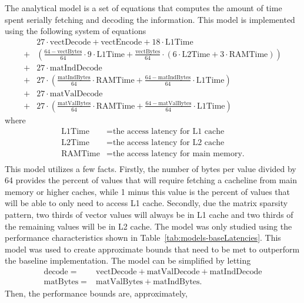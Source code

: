 The analytical model is a set of equations that computes the amount of time spent serially fetching and decoding the information.
This model is implemented using the following system of equations
\begin{align*}
	& 27\cdot \mathrm{vectDecode}+\mathrm{vectEncode} + 18\cdot \mathrm{L1Time} \\
	+ & \left(\frac{64-\mathrm{vectBytes}}{64}\cdot 9\cdot \mathrm{L1Time}+\frac{\mathrm{vectBytes}}{64}\cdot \left(6\cdot \mathrm{L2Time}+3\cdot \mathrm{RAMTime}\right)\right) \\
	+ & 27\cdot\mathrm{matIndDecode} \\
	+ & 27\cdot\left(\frac{\mathrm{matIndBytes}}{64}\cdot\mathrm{RAMTime} + \frac{64-\mathrm{matIndBytes}}{64}\cdot\mathrm{L1Time}\right) \\
	+ & 27\cdot\mathrm{matValDecode} \\
	+ & 27\cdot\left(\frac{\mathrm{matValBytes}}{64}\cdot\mathrm{RAMTime}+\frac{64-\mathrm{matValBytes}}{64}\cdot\mathrm{L1Time}\right)
\end{align*}
where
\begin{align*}
	\mathrm{L1Time} &= \text{the access latency for L1 cache} \\
	\mathrm{L2Time} &= \text{the access latency for L2 cache} \\
	\mathrm{RAMTime} &= \text{the access latency for main memory.} \\
\end{align*}
This model utilizes a few facts.
Firstly, the number of bytes per value divided by 64 provides the percent of values that will require fetching a cacheline from main memory or higher caches, while 1 minus this value is the percent of values that will be able to only need to access L1 cache.
Secondly, due the matrix sparsity pattern, two thirds of vector values will always be in L1 cache and two thirds of the remaining values will be in L2 cache.
The model was only studied using the performance characteristics shown in Table~\ref{tab:models-baseLatencies}.
This model was used to create approximate bounds that need to be met to outperform the baseline implementation.
The model can be simplified by letting
\begin{align*}
\mathrm{decode} =& \mathrm{vectDecode} + \mathrm{matValDecode} + \mathrm{matIndDecode} \\
\mathrm{matBytes} =& \mathrm{matValBytes} + \mathrm{matIndBytes}.
\end{align*}
Then, the performance bounds are, approximately,
